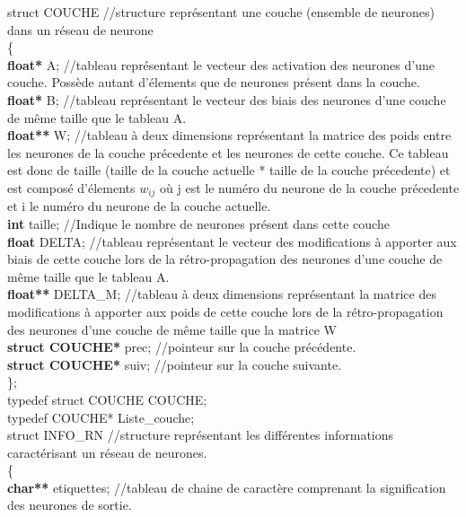 \documentclass{article}
\newcommand\tab[1][1cm]{\hspace*{#1}}
\begin{document}
	\begin{flushleft}
	
		struct COUCHE	//structure représentant une couche (ensemble de neurones) dans un réseau de neurone\\
		\{\\
			\tab \textcolor{myblue}{\textbf{float*}} A;	//tableau représentant le vecteur des activation des neurones d'une couche. Possède autant d'élements que de neurones présent dans la couche.\\
			\tab \textcolor{myblue}{\textbf{float*}} B;	//tableau représentant le vecteur des biais des neurones d'une couche de même taille que le tableau A.\\
			\tab \textcolor{myblue}{\textbf{float**}} W;	//tableau à deux dimensions représentant la matrice des poids entre les neurones de la couche précedente et les neurones de cette couche. Ce tableau est donc de taille (taille de la couche actuelle * taille de la couche précedente) et est composé d'élements $w_{ij}$ où j est le numéro du neurone de la couche précedente et i le numéro du neurone de la couche actuelle.\\
			\tab \textcolor{myblue}{\textbf{int}} taille;	//Indique le nombre de neurones présent dans cette couche\\
			\tab \textcolor{myblue}{\textbf{float}} DELTA;      //tableau représentant le vecteur des modifications à apporter aux biais de cette couche lors de la rétro-propagation des neurones d'une couche de même taille que le tableau A.\\
			\tab \textcolor{myblue}{\textbf{float**}} DELTA\_M; //tableau à deux dimensions représentant la matrice des modifications à apporter aux poids de cette couche lors de la rétro-propagation des neurones d'une couche de même taille que la matrice W\\
			\medbreak
			\tab \textcolor{myblue}{\textbf{struct COUCHE*}} prec;	//pointeur sur la couche précédente.\\
			\tab \textcolor{myblue}{\textbf{struct COUCHE*}} suiv;	//pointeur sur la couche suivante.\\
		\};\\
		\bigbreak
		typedef struct COUCHE COUCHE;\\
		typedef COUCHE* Liste\_couche;\\
		\bigbreak
		struct INFO\_RN	//structure représentant les différentes informations caractérisant un réseau de neurones.\\
		\{\\
			\tab \textcolor{myblue}{\textbf{char**}} etiquettes;	//tableau de chaine de caractère comprenant la signification des neurones de sortie.\\

\end{flushleft}
\end{document}
